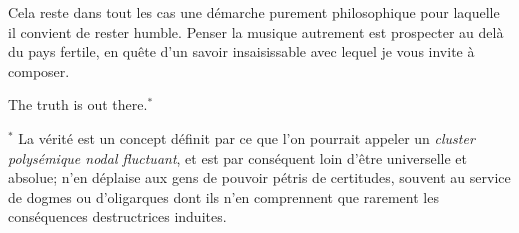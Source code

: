 \documentclass{article}
\begin{document}
Cela reste dans tout les cas une démarche purement philosophique pour laquelle il convient de rester humble. Penser la musique autrement est prospecter au delà du pays fertile, en quête d’un savoir insaisissable avec lequel je vous invite à composer.
\newpage
  
\nolinenumbers
{}
\printendnotes

\newpage

\begin{titlepage} 
\clearpage
\thispagestyle{empty}
\pagecolor{yellow!10}

\vspace*{\baselineskip} 	
	
	\vspace*{0.167\textheight} 
	
\centerline{The truth is out there.$^*$}
  \vfill
  {\scriptsize \noindent $^*$ La vérité est un concept définit par ce que l'on pourrait appeler un \textit{cluster polysémique nodal fluctuant}, et est par conséquent loin d'être universelle et absolue; n'en déplaise aux gens de pouvoir pétris de certitudes, souvent au service de dogmes ou d'oligarques dont ils n'en comprennent que rarement les conséquences destructrices induites.}
  

\end{titlepage}
\end{document}
